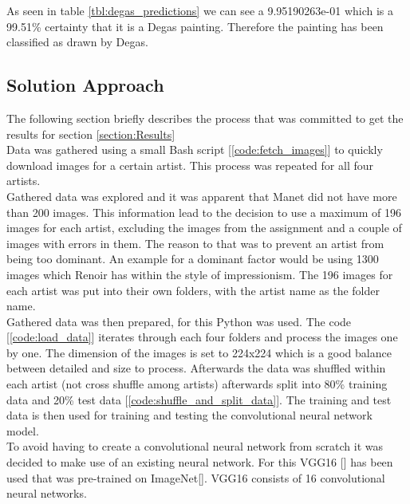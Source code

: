 As seen in table \ref{tbl:degas_predictions} we can see a 9.95190263e-01 which is a 99.51\% certainty that it is a Degas painting. Therefore the painting has been classified as drawn by Degas.





\subsection{Solution Approach}
The following section briefly describes the process that was committed to get the results for section \ref{section:Results}\\

 Data was gathered using a small Bash script [\ref{code:fetch_images}] to quickly download images for a certain artist. This process was repeated for all four artists.\\

 Gathered data was explored and it was apparent that Manet did not have more than 200 images. This information lead to the decision to use a maximum of 196 images for each artist, excluding the images from the assignment and a couple of images with errors in them. The reason to that was to prevent an artist from being too dominant. An example for a dominant factor would be using 1300 images which Renoir has within the style of impressionism. The 196 images for each artist was put into their own folders, with the artist name as the folder name.\\

 Gathered data was then prepared, for this Python was used. The code [\ref{code:load_data}] iterates through each four folders and process the images one by one. The dimension of the images is set to 224x224 which is a good balance between detailed and size to process. Afterwards the data was shuffled within each artist (not cross shuffle among artists) afterwards split into 80\% training data and 20\% test data [\ref{code:shuffle_and_split_data}]. The training and test data is then used for training and testing the convolutional neural network model.\\

 To avoid having to create a convolutional neural network from scratch it was decided to make use of an existing neural network. For this VGG16 [\cite{DBLP:journals/corr/SimonyanZ14a}] has been used that was pre-trained on ImageNet[\cite{imagenet_cvpr09}]. VGG16 consists of 16 convolutional neural networks.\\

